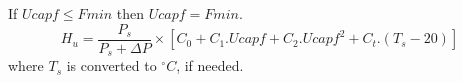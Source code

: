 If $Ucapf \le Fmin$ then $Ucapf = Fmin $.
\[
H_u = \frac{P_s}{P_s + \Delta P} \times 
      \left[ C_0 + C_1.Ucapf + C_2.Ucapf^2 + 
       C_t.(T_s - 20 ) \right]
\]
where $T_s$ is converted to $^\circ C$, if needed.
